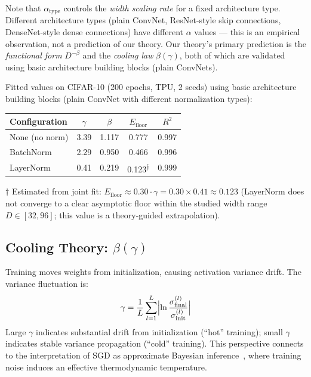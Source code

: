 \documentclass[11pt, a4paper]{article}
\theoremstyle{plain}
\begin{document}
Note that $\alpha_{\mathrm{type}}$ controls the \emph{width scaling rate} for a fixed architecture type. Different architecture types (plain ConvNet, ResNet-style skip connections, DenseNet-style dense connections) have different $\alpha$ values --- this is an empirical observation, not a prediction of our theory. Our theory's primary prediction is the \emph{functional form} $D^{-\beta}$ and the \emph{cooling law} $\beta(\gamma)$, both of which are validated using basic architecture building blocks (plain ConvNets).

Fitted values on CIFAR-10 (200 epochs, TPU, 2 seeds) using basic architecture building blocks (plain ConvNet with different normalization types):

\begin{center}
\begin{tabular}{lcccc}
\toprule
Configuration & $\gamma$ & $\beta$ & $E_{\mathrm{floor}}$ & $R^2$ \\
\midrule
None (no norm) & 3.39 & 1.117 & 0.777 & 0.997 \\
BatchNorm & 2.29 & 0.950 & 0.466 & 0.996 \\
LayerNorm & 0.41 & 0.219 & 0.123\textsuperscript{$\dagger$} & 0.999 \\
\bottomrule
\end{tabular}
\end{center}
{\small $\dagger$ Estimated from joint fit: $E_{\mathrm{floor}} \approx 0.30 \cdot \gamma = 0.30 \times 0.41 \approx 0.123$ (LayerNorm does not converge to a clear asymptotic floor within the studied width range $D \in [32,96]$; this value is a theory-guided extrapolation).}
\medskip

\subsection{Cooling Theory: $\beta(\gamma)$}\label{sec:cooling-theory}

Training moves weights from initialization, causing activation variance drift. The variance fluctuation is:
\begin{equation}
\gamma = \frac{1}{L}\sum_{l=1}^{L}\Bigl|\ln\frac{\sigma_{\mathrm{final}}^{(l)}}{\sigma_{\mathrm{init}}^{(l)}}\Bigr|
\end{equation}
Large $\gamma$ indicates substantial drift from initialization (``hot'' training); small $\gamma$ indicates stable variance propagation (``cold'' training). This perspective connects to the interpretation of SGD as approximate Bayesian inference~\citep{mandt2017stochastic}, where training noise induces an effective thermodynamic temperature.
\end{document}
